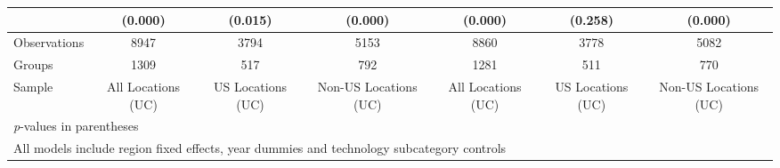 \begin{table}[htbp]
\begin{tabular}{l*{6}{c}}
                &  (0.000)&  (0.015)&  (0.000)&  (0.000)&  (0.258)&  (0.000)\\
\hline
Observations    &     8947&     3794&     5153&     8860&     3778&     5082\\
Groups          &     1309&      517&      792&     1281&      511&      770\\
Sample          &All Locations (UC)&US Locations (UC)&Non-US Locations (UC)&All Locations (UC)&US Locations (UC)&Non-US Locations (UC)\\
\hline\hline
\multicolumn{7}{l}{\footnotesize \textit{p}-values in parentheses}\\
\multicolumn{7}{l}{\footnotesize All models include region fixed effects, year dummies and technology subcategory controls}\\
\end{tabular}
\end{table}
